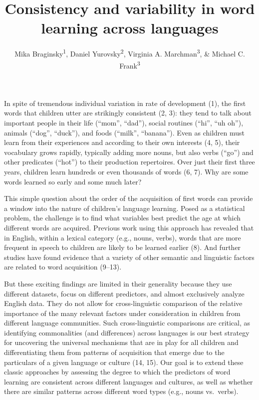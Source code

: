 \documentclass[english,man]{apa6}
\title{Consistency and variability in word learning across languages}
\author{Mika Braginsky\textsuperscript{1}, Daniel Yurovsky\textsuperscript{2}, Virginia A. Marchman\textsuperscript{3}, \& Michael C. Frank\textsuperscript{3}}
\affiliation{
    \vspace{0.5cm}
          \textsuperscript{1} Department of Brain and Cognitive Sciences, Massachusetts Institute of
Technology\\
          \textsuperscript{2} Department of Psychology, University of Chicago\\
          \textsuperscript{3} Department of Psychology, Stanford University  }
\theoremstyle{definition}
\theoremstyle{definition}
\theoremstyle{definition}
\theoremstyle{remark}
\begin{document}
\maketitle

\setcounter{secnumdepth}{0}



In spite of tremendous individual variation in rate of development (1),
the first words that children utter are strikingly consistent (2, 3):
they tend to talk about important people in their life (\enquote{mom},
\enquote{dad}), social routines (\enquote{hi}, \enquote{uh oh}), animals
(\enquote{dog}, \enquote{duck}), and foods (\enquote{milk},
\enquote{banana}). Even as children must learn from their experiences
and according to their own interests (4, 5), their vocabulary grows
rapidly, typically adding more nouns, but also verbs (\enquote{go}) and
other predicates (\enquote{hot}) to their production repertoires. Over
just their first three years, children learn hundreds or even thousands
of words (6, 7). Why are some words learned so early and some much
later?

This simple question about the order of the acquisition of first words
can provide a window into the nature of children's language learning.
Posed as a statistical problem, the challenge is to find what variables
best predict the age at which different words are acquired. Previous
work using this approach has revealed that in English, within a lexical
category (e.g., nouns, verbs), words that are more frequent in speech to
children are likely to be learned earlier (8). And further studies have
found evidence that a variety of other semantic and linguistic factors
are related to word acquisition (9--13).

But these exciting findings are limited in their generality because they
use different datasets, focus on different predictors, and almost
exclusively analyze English data. They do not allow for cross-linguistic
comparison of the relative importance of the many relevant factors under
consideration in children from different language communities. Such
cross-linguistic comparisons are critical, as identifying commonalities
(and differences) across languages is our best strategy for uncovering
the universal mechanisms that are in play for all children and
differentiating them from patterns of acquisition that emerge due to the
particulars of a given language or culture (14, 15). Our goal is to
extend these classic approaches by assessing the degree to which the
predictors of word learning are consistent across different languages
and cultures, as well as whether there are similar patterns across
different word types (e.g., nouns vs.~verbs).
\end{document}
